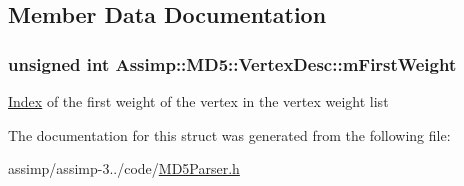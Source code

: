 \subsection{Member Data Documentation}
\hypertarget{struct_assimp_1_1_m_d5_1_1_vertex_desc_a3106a81ce842f268266e80b5ca5a8532}{
\subsubsection[{m\+First\+Weight}]{\setlength{\rightskip}{0pt plus 5cm}unsigned int Assimp\+::\+M\+D5\+::\+Vertex\+Desc\+::m\+First\+Weight}}\label{struct_assimp_1_1_m_d5_1_1_vertex_desc_a3106a81ce842f268266e80b5ca5a8532}
\hyperlink{struct_index}{Index} of the first weight of the vertex in the vertex weight list 

The documentation for this struct was generated from the following file\+:\begin{DoxyCompactItemize}
\item 
assimp/assimp-\/3../code/\hyperlink{_m_d5_parser_8h}{M\+D5\+Parser.\+h}\end{DoxyCompactItemize}
